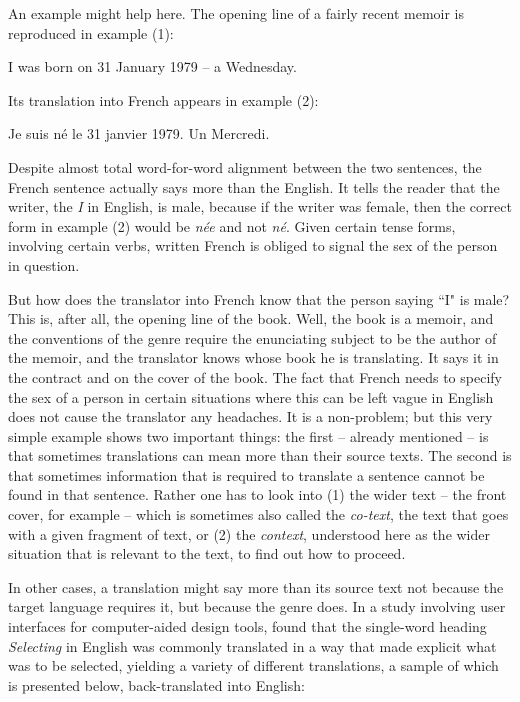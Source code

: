 \documentclass[output=paper]{langscibook}
\begin{document}
An example might help here. The opening line of a fairly recent memoir \citep{Tammet2006} is reproduced in example (1):

\ea
I was born on 31 January 1979 – a Wednesday.
\z


Its translation into French \citep{Tammet2009} appears in example (2):

\ea
Je suis né le 31 janvier 1979. Un Mercredi.
\z

Despite almost total word-for-word alignment between the two sentences, the French sentence actually says more than the English. It tells the reader that the writer, the \textit{I} in English, is male, because if the writer was female, then the correct form in example (2) would be \textit{née} and not \textit{né}. Given certain tense forms, involving certain verbs, written French is obliged to signal the sex of the person in question.   

But how does the translator into French know that the person saying “I" is male? This is, after all, the opening line of the book. Well, the book is a memoir, and the conventions of the genre require the enunciating subject to be the author of the memoir, and the translator knows whose book he is translating. It says it in the contract and on the cover of the book. The fact that French needs to specify the sex of a person in certain situations where this can be left vague in English does not cause the translator any headaches. It is  a non-problem; but this very simple example shows two important things: the first -- already mentioned -- is that sometimes translations can mean more than their source texts. The second is that sometimes information that is required to translate a sentence cannot be found in that sentence. Rather one has to look into (1) the wider text -- the front cover, for example -- which is sometimes also called the \emph{co-text}, the text that goes with a given fragment of text, or (2) the \textit{context}, understood here as the wider situation that is relevant to the text, to find out how to proceed.

In other cases, a translation might say more than its source text not because the target language requires it, but because the genre does. In a study involving user interfaces for computer-aided design tools, \citet{Moorkens2012} found that the single-word heading \textit{Selecting} in English was commonly translated in a way that made explicit what was to be selected, yielding a variety of different translations, a sample of which is presented below, back-translated into English:
\end{document}
